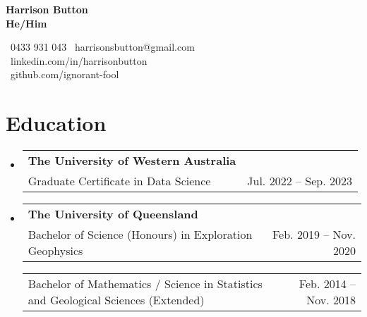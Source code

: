 \documentclass[letterpaper,11pt]{article}
\makeatletter
\newcommand{\resumeItem}[2]{
  \item\small{
    \textbf{#1}{#2 \vspace{-2pt}}
  }
}
\newcommand{\resumeSubheading}[4]{
  \vspace{-1pt}\item
    \begin{tabular*}{0.97\textwidth}[t]{l@{\extracolsep{\fill}}r}
      \textbf{#1} & #2 \\
      {\small #3} & {\small #4} \\
    \end{tabular*}\vspace{-5pt}
}
\newcommand{\resumeSubSubheading}[2]{
    \begin{tabular*}{0.97\textwidth}{l@{\extracolsep{\fill}}r}
      {\small#1} & {\small #2} \\
    \end{tabular*}\vspace{-5pt}
}
\newcommand{\resumeSubHeadingListStart}{\begin{itemize}[leftmargin=*]}
\newcommand{\resumeSubHeadingListEnd}{\end{itemize}}
\makeatother
\begin{document}
\begin{minipage}[c]{.4\linewidth}
    {\textbf{\Huge Harrison Button \\ \small{He/Him} }}%
\end{minipage}%
\begin{minipage}[c]{.6\linewidth}
    \begin{flushright}
        ~0433 931 043 \hspace{1pt} ~harrisonsbutton@gmail.com \\
        ~linkedin.com/in/harrisonbutton \\ 
        ~github.com/ignorant-fool
    \end{flushright}
\end{minipage}

    

\section{Education}
\resumeSubHeadingListStart
\resumeSubheading
    {The University of Western Australia}{}
    {Graduate Certificate in Data Science}{Jul. 2022 -- Sep. 2023}
\resumeSubheading
    {The University of Queensland}{}
    {Bachelor of Science (Honours) in Exploration Geophysics}{Feb. 2019 -- Nov. 2020}
\resumeSubSubheading
    {Bachelor of Mathematics / Science in Statistics and Geological Sciences (Extended)}{Feb. 2014 -- Nov. 2018}
\resumeSubHeadingListEnd
\end{document}
